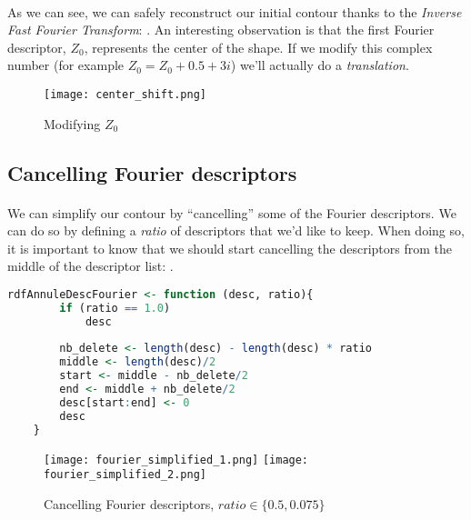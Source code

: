 \paragraph{}
As we can see, we can safely reconstruct our initial contour thanks to the \emph{Inverse Fast Fourier Transform}: \cite[FFT]{fast_fourier_transform}.
An interesting observation is that the first Fourier descriptor, $Z_0$, represents the center of the shape.
If we modify this complex number (for example $Z_0 = Z_0 + 0.5 + 3i$) we'll actually do a \emph{translation}.

\begin{figure}[ht]
    \centering
    \texttt{[image: center\_shift.png]}
    \caption{Modifying $Z_0$}
\end{figure}

\clearpage

\subsection{Cancelling Fourier descriptors}
\paragraph{}
We can simplify our contour by ``cancelling'' some of the Fourier descriptors.
We can do so by defining a \emph{ratio} of descriptors that we'd like to keep.
When doing so, it is important to know that we should start cancelling the descriptors from the middle of the descriptor list: \cite[RDF Course]{lille_rdf_course}.

\begin{lstlisting}[language=R, caption=Simplifying contour]
    rdfAnnuleDescFourier <- function (desc, ratio){
        if (ratio == 1.0)
            desc
        
        nb_delete <- length(desc) - length(desc) * ratio
        middle <- length(desc)/2
        start <- middle - nb_delete/2
        end <- middle + nb_delete/2
        desc[start:end] <- 0
        desc
    }
\end{lstlisting}

\begin{figure}[ht]
    \centering
    \texttt{[image: fourier\_simplified\_1.png]}
    \texttt{[image: fourier\_simplified\_2.png]}
    \caption{Cancelling Fourier descriptors, $ratio \in \{0.5, 0.075\}$}
\end{figure}

\clearpage

